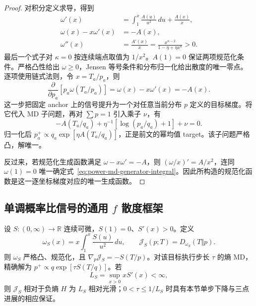 \documentclass[lang=cn,scheme=chinese,openany]{../book/elegantbook}
\begin{document}
\begin{proof}
对积分定义求导，得到
\begin{align}
 \omega'(x)&=\int_1^x\frac{A(u)}{u^2}\,du+\frac{A(x)}x,\\
 \omega(x)-x\omega'(x)&=-A(x),\\
 \omega''(x)&=\frac{A'(x)}x
 =\frac{x^{\kappa-2}}{1-\eta+\eta x^\kappa}>0.
 \label{eq:power-md-curvature}
\end{align}
最后一个式子对 $\kappa=0$ 按连续端点取值为 $1/x^2$。$A(1)=0$ 保证两项规范化条件。严格凸性给出 $\omega\ge0$，Jensen 等号条件和分布归一化给出散度的唯一零点。逐项使用链式法则，令 $x=T_a/p_a$，则
\begin{equation}
 \frac\partial{\partial p_a}[p_a\omega(T_a/p_a)]
 =\omega(x)-x\omega'(x)=-A(x).
\end{equation}
这一步把固定 anchor 上的信号提升为一个对任意当前分布 $p$ 定义的目标梯度。将它代入 MD 子问题，再对 $\sum p=1$ 引入乘子 $\nu$，有
\begin{equation}
 -A(T_a/q_a)+\eta^{-1}[\log(p_a/q_a)+1]+\nu=0.
\end{equation}
归一化后 $p_a^+\propto q_a\exp[\eta A(T_a/q_a)]$，正是前文的幂均值 target。该子问题严格凸，解唯一。

反过来，若规范化生成函数满足 $\omega-x\omega'=-A$，则 $(\omega/x)'=A/x^2$，连同 $\omega(1)=0$ 唯一确定式~\eqref{eq:power-md-generator-integral}。因此所构造的规范化函数是这一逐坐标梯度对应的唯一生成函数。
\end{proof}

\subsection{单调概率比信号的通用 $f$ 散度框架}

\begin{proposition}[单调信号的可积性与相对光滑性]
\label{prop:power-general-signal-framework}
设 $S:(0,\infty)\to\mathbb R$ 连续可微，$S(1)=0$、$S'(x)>0$。定义
\begin{equation}
 \omega_S(x)=x\int_1^x\frac{S(u)}{u^2}\,du,\qquad
 \mathcal J_S(p;T)=D_{\omega_S}(T\Vert p).
\end{equation}
则 $\omega_S$ 严格凸、规范化，且 $\nabla_p\mathcal J_S=-S(T/p)$。对该目标执行步长 $\tau$ 的熵 MD，精确解为 $p^+\propto q\exp[\tau S(T/q)]$。若
\begin{equation}
 L_S=\sup_{x>0}xS'(x)<\infty,
\end{equation}
则 $\mathcal J_S$ 相对于负熵 $H$ 为 $L_S$ 相对光滑；$0<\tau\le1/L_S$ 时具有本节单步下降与三点进展的相应保证。
\end{proposition}
\end{document}
